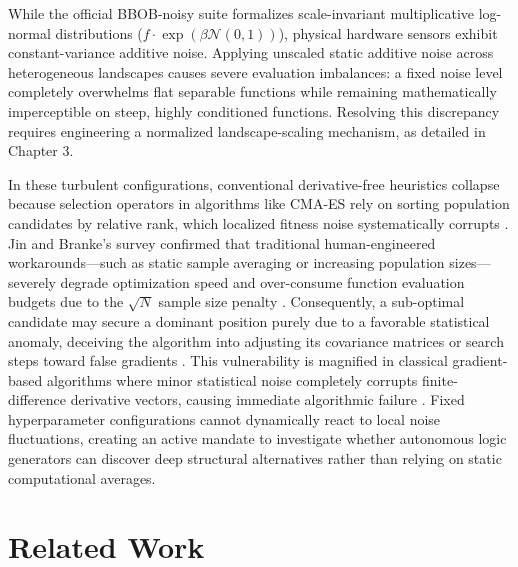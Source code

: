 While the official BBOB-noisy suite \cite{Hansen2009Noisy} formalizes scale-invariant multiplicative log-normal distributions ($f \cdot \exp(\beta \mathcal{N}(0,1))$), physical hardware sensors exhibit constant-variance additive noise. Applying unscaled static additive noise across heterogeneous landscapes causes severe evaluation imbalances: a fixed noise level completely overwhelms flat separable functions while remaining mathematically imperceptible on steep, highly conditioned functions. Resolving this discrepancy requires engineering a normalized landscape-scaling mechanism, as detailed in Chapter 3.

In these turbulent configurations, conventional derivative-free heuristics collapse because selection operators in algorithms like CMA-ES rely on sorting population candidates by relative rank, which localized fitness noise systematically corrupts \cite{Jin2005, Miller1996}. Jin and Branke's survey confirmed that traditional human-engineered workarounds—such as static sample averaging or increasing population sizes—severely degrade optimization speed and over-consume function evaluation budgets due to the $\sqrt{N}$ sample size penalty \cite{Jin2005}. Consequently, a sub-optimal candidate may secure a dominant position purely due to a favorable statistical anomaly, deceiving the algorithm into adjusting its covariance matrices or search steps toward false gradients \cite{Jin2005, Hansen2009Noisy}. This vulnerability is magnified in classical gradient-based algorithms where minor statistical noise completely corrupts finite-difference derivative vectors, causing immediate algorithmic failure \cite{Sarafian2024}. Fixed hyperparameter configurations cannot dynamically react to local noise fluctuations, creating an active mandate to investigate whether autonomous logic generators can discover deep structural alternatives rather than relying on static computational averages.


\section{Related Work}\label{sec:related_work}


